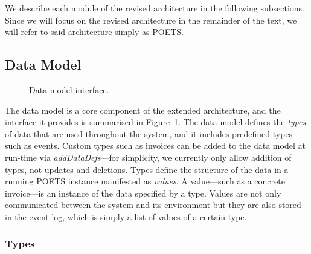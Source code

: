 We describe each module of the revised architecture in the following
subsections. Since we will focus on the revised architecture in the
remainder of the text, we will refer to said architecture simply as
POETS.

\subsection{Data Model}
\label{sec:data-model}

\begin{figure}[t]
  \centering\small
  \newcommand\comp[4][]{%
    \node[box,#1] (#2) {#3\nodepart{two}#4};
  }%
  \caption{Data model interface.}
  \label{fig:data-model}
\end{figure}

The data model is a core component of the extended architecture, and
the interface it provides is summarised in
Figure~\ref{fig:data-model}. The data model defines the \emph{types}
of data that are used throughout the system, and it includes predefined
types such as events. Custom types such as invoices can be added to
the data model at run-time via \emph{addDataDefs}---for simplicity, we
currently only allow addition of types, not updates and deletions. Types define the
structure of the data in a running POETS instance manifested as
\emph{values}. A value---such as a concrete invoice---is an instance
of the data specified by a type. Values are not only communicated
between the system and its environment but they are also stored in the
event log, which is simply a list of values of a certain type.

\subsubsection{Types}
\label{sec:types}

